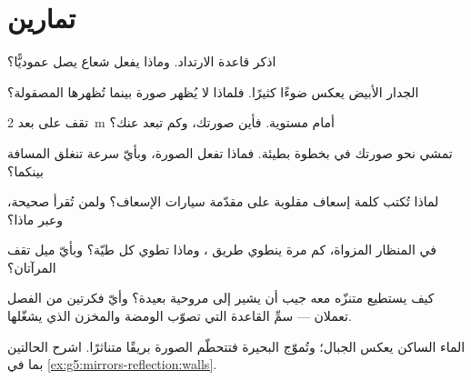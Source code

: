 \section{تمارين}

\begin{exercise}[$\star$]\label{exo:g5:mirrors-reflection:1}
اذكر قاعدة الارتداد. وماذا يفعل شعاع يصل عموديًّا؟
\end{exercise}

\begin{exercise}[$\star$]\label{exo:g5:mirrors-reflection:2}
الجدار الأبيض يعكس ضوءًا كثيرًا. فلماذا لا يُظهر صورة بينما
تُظهرها  المصقولة؟
\end{exercise}

\begin{exercise}[$\star$]\label{exo:g5:mirrors-reflection:3}
تقف على بعد \qty{2}{m} أمام  مستوية. فأين صورتك، وكم تبعد
عنك؟
\end{exercise}

\begin{exercise}[$\star$]\label{exo:g5:mirrors-reflection:4}
تمشي نحو صورتك في  بخطوة بطيئة. فماذا تفعل الصورة، وبأيّ
سرعة تنغلق المسافة بينكما؟
\end{exercise}

\begin{exercise}[$\star$]\label{exo:g5:mirrors-reflection:5}
لماذا تُكتب كلمة إسعاف مقلوبة على مقدّمة سيارات الإسعاف؟ ولمن
تُقرأ صحيحة، وعبر ماذا؟
\end{exercise}

\begin{exercise}[$\star$]\label{exo:g5:mirrors-reflection:6}
في المنظار المزواة، كم مرة ينطوي طريق ، وماذا تطوي كل
طيّة؟ وبأيّ ميل تقف المرآتان؟
\end{exercise}

\begin{exercise}[$\star$]\label{exo:g5:mirrors-reflection:7}
كيف يستطيع متنزّه معه  جيب أن يشير إلى مروحية بعيدة؟ وأيّ
فكرتين من الفصل تعملان --- سمِّ القاعدة التي تصوّب الومضة
والمخزن الذي يشغّلها.
\end{exercise}

\begin{exercise}[$\star$]\label{exo:g5:mirrors-reflection:8}
الماء الساكن يعكس الجبال؛ وتُموّج  البحيرة فتتحطّم الصورة
بريقًا متناثرًا. اشرح الحالتين بما في
\cref{ex:g5:mirrors-reflection:walls}.
\end{exercise}

